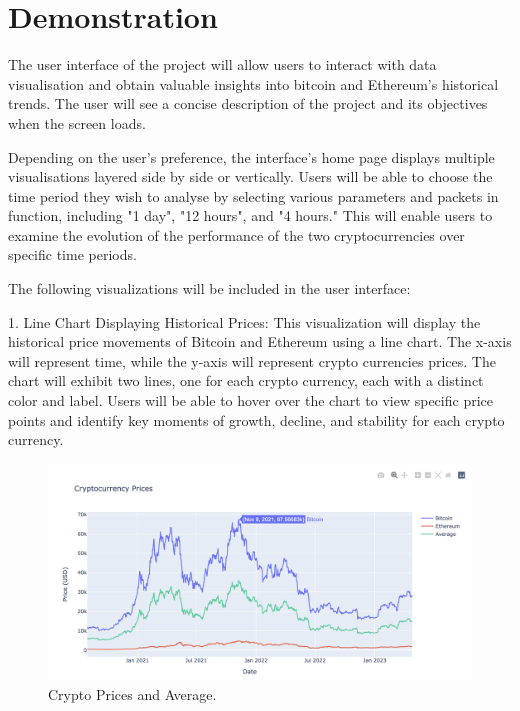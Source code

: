 \documentclass[10pt,twocolumn,a4paper]{article}
\begin{document}
\section{Demonstration}
The user interface of the project will allow users to interact with data visualisation and obtain valuable insights into bitcoin and Ethereum's historical trends. The user will see a concise description of the project and its objectives when the screen loads.

Depending on the user's preference, the interface's home page displays multiple visualisations layered side by side or vertically. Users will be able to choose the time period they wish to analyse by selecting various parameters and packets in function, including "1 day", "12 hours", and "4 hours." This will enable users to examine the evolution of the performance of the two cryptocurrencies over specific time periods.

The following visualizations will be included in the user interface:

1. Line Chart Displaying Historical Prices: This visualization will display the historical price movements of Bitcoin and Ethereum using a line chart. The x-axis will represent time, while the y-axis will represent crypto currencies prices. The chart will exhibit two lines, one for each crypto currency, each with a distinct color and label. Users will be able to hover over the chart to view specific price points and identify key moments of growth, decline, and stability for each crypto currency.
\begin{figure}[!h]
  \centering
  \includegraphics[width=1\linewidth]{Cryptocurrency.png}
  \caption{Crypto Prices and Average.}
  \label{fig:example}
\end{figure}
\end{document}

